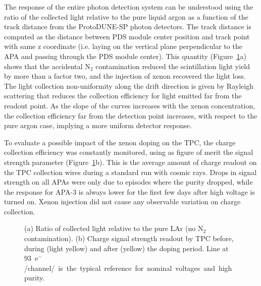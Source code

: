 \documentclass[a4paper]{article}
\begin{document}
The response of the entire photon detection system can be understood using the ratio of the collected light relative to the pure liquid argon as a function of the track distance from the ProtoDUNE-SP photon detectors. The track distance is computed as the distance between PDS module center position and track point with same z coordinate (i.e. laying on the vertical plane perpendicular to the APA and passing through the PDS module center). This quantity (Figure~\ref{fig:PDS-result}a) shows that the accidental N$_2$ contamination reduced the scintillation light yield by more than a factor two, and the injection of xenon recovered the light loss. The light collection non-uniformity along the drift direction is given by Rayleigh scattering that reduces the collection efficiency for light emitted far from the readout point. As the slope of the curves increases with the xenon concentration, the collection efficiency far from the detection point increases, with respect to the pure argon case, implying a more uniform detector response.

To evaluate a possible impact of the xenon doping on the TPC, the charge collection efficiency was constantly monitored, using as figure of merit the signal strength parameter (Figure~\ref{fig:PDS-result}b). This is the average amount of charge readout on the TPC collection wires during a standard run with cosmic rays. Drops in signal strength on all APAs were only due to episodes where the purity dropped, while the response for APA-3 is always lower for the first few days after high voltage is turned on. Xenon injection did not cause any observable variation on charge collection.
\begin{figure}
    \centering
    \caption{(a) Ratio of collected light relative to the pure LAr (no $\text{N}_2$ contamination). (b) Charge signal strength readout by TPC before, during (light yellow) and after (yellow) the doping period. Line at \SI{93}{\kilo e$^-$/channel/\milli\second} is the typical reference for nominal voltages and high purity.}
    \label{fig:PDS-result}
\end{figure}
\end{document}
